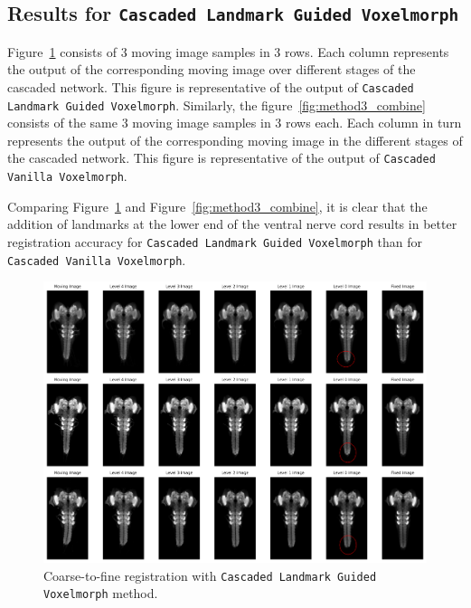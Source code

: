 \documentclass{book}
\begin{document}
	\subsection{Results for \texttt{Cascaded Landmark Guided Voxelmorph}}
	Figure~\ref{fig:method4_combine} consists of 3 moving image samples in 3 rows. Each column represents the output of the corresponding moving image over different stages of the cascaded network. This figure is representative of the output of \texttt{Cascaded Landmark Guided Voxelmorph}. Similarly, the figure~\ref{fig:method3_combine} consists of the same 3 moving image samples in 3 rows each. Each column in turn represents the output of the corresponding moving image in the different stages of the cascaded network. This figure is representative of the output of \texttt{Cascaded Vanilla Voxelmorph}.
	
	Comparing Figure~\ref{fig:method4_combine} and Figure~\ref{fig:method3_combine}, it is clear that the addition of landmarks at the lower end of the ventral nerve cord results in better registration accuracy for \texttt{Cascaded Landmark Guided Voxelmorph} than for \texttt{Cascaded Vanilla Voxelmorph}.
	
	\begin{figure}[h!]
		\centering
		\includegraphics[width=\columnwidth]{resources/chapter4/method4/ldm/registered_images.png}
		\caption{Coarse-to-fine registration with \texttt{Cascaded Landmark Guided Voxelmorph} method.}
		\label{fig:method4_combine}
	\end{figure}
	
\end{document}
